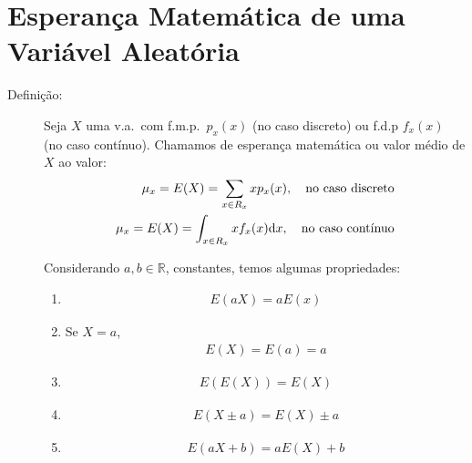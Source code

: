        \section{Esperança Matemática de uma Variável Aleatória}
       \begin{description}
         \item [Definição:] Seja $X$ uma v.a.\ com f.m.p.\ $p_{x}(x)$ (no caso discreto) ou f.d.p
           $f_{x}(x)$ (no caso contínuo). Chamamos de esperança matemática ou valor médio 
           de $X$ ao valor: 
           \begin{align}
             \mu_{x}= E(X)= \sum \limits_{x \in R_{x}} x p_{x}(x) , 
             \text{\quad no caso discreto}\\
             \mu_{x}= E(X)= \int_{x \in R_{x}} x f_{x}(x)\mathrm{d}x, \text{\quad no caso contínuo}
           \end{align}

           Considerando $a,b \in \mathbb{R}$, constantes, temos  algumas propriedades:

           \begin{enumerate}[label=(\alph*)]
             \item 
               \begin{align}
                 E(aX)=aE(x)
               \end{align}
             \item Se $X=a$, 
               \begin{align}
                 E(X)=E(a)=a
               \end{align}
             \item 
             \begin{align}    E\left(E\left(X\right)\right)= E(X)\end{align}
             \item 
             \begin{align}  E(X \pm a)=E(X)\pm a\end{align}
  \item 
  \begin{align}  E(aX + b)=aE(X)+ b\end{align}


\end{enumerate}
\end{description}
